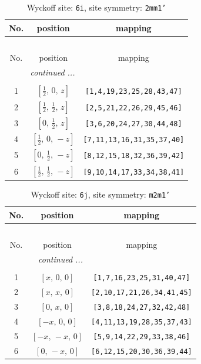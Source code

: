 \documentclass[fleqn,8pt]{jsarticle}
\begin{document}
\renewcommand{\arraystretch}{1.2}
\begin{longtable}{ccc}
\caption{Wyckoff site: {\tt 6i}, site symmetry: {\tt 2mm1'}}
 \\
 \hline \hline
No. & position & mapping \\ \hline \endfirsthead

\multicolumn{2}{l}{\tablename\ \thetable{}} \\
 \hline \hline
No. & position & mapping \\ \hline \endhead

 \hline \hline
\multicolumn{2}{r}{\footnotesize\it continued ...} \\ \endfoot

 \hline \hline
\multicolumn{2}{r}{} \\ \endlastfoot

1 & $\left[ \frac{1}{2},\, 0,\, z \right]$ & {\tt [1,4,19,23,25,28,43,47]} \\ \hline
2 & $\left[ \frac{1}{2},\, \frac{1}{2},\, z \right]$ & {\tt [2,5,21,22,26,29,45,46]} \\ \hline
3 & $\left[ 0,\, \frac{1}{2},\, z \right]$ & {\tt [3,6,20,24,27,30,44,48]} \\ \hline
4 & $\left[ \frac{1}{2},\, 0,\, - z \right]$ & {\tt [7,11,13,16,31,35,37,40]} \\ \hline
5 & $\left[ 0,\, \frac{1}{2},\, - z \right]$ & {\tt [8,12,15,18,32,36,39,42]} \\ \hline
6 & $\left[ \frac{1}{2},\, \frac{1}{2},\, - z \right]$ & {\tt [9,10,14,17,33,34,38,41]} \\
\end{longtable}
\renewcommand{\arraystretch}{1.2}
\begin{longtable}{ccc}
\caption{Wyckoff site: {\tt 6j}, site symmetry: {\tt m2m1'}}
 \\
 \hline \hline
No. & position & mapping \\ \hline \endfirsthead

\multicolumn{2}{l}{\tablename\ \thetable{}} \\
 \hline \hline
No. & position & mapping \\ \hline \endhead

 \hline \hline
\multicolumn{2}{r}{\footnotesize\it continued ...} \\ \endfoot

 \hline \hline
\multicolumn{2}{r}{} \\ \endlastfoot

1 & $\left[ x,\, 0,\, 0 \right]$ & {\tt [1,7,16,23,25,31,40,47]} \\ \hline
2 & $\left[ x,\, x,\, 0 \right]$ & {\tt [2,10,17,21,26,34,41,45]} \\ \hline
3 & $\left[ 0,\, x,\, 0 \right]$ & {\tt [3,8,18,24,27,32,42,48]} \\ \hline
4 & $\left[ - x,\, 0,\, 0 \right]$ & {\tt [4,11,13,19,28,35,37,43]} \\ \hline
5 & $\left[ - x,\, - x,\, 0 \right]$ & {\tt [5,9,14,22,29,33,38,46]} \\ \hline
6 & $\left[ 0,\, - x,\, 0 \right]$ & {\tt [6,12,15,20,30,36,39,44]} \\
\end{longtable}
\end{document}
